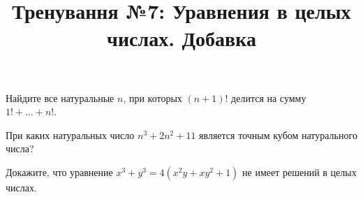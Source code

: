 



\title{Тренування №7: Уравнения в целых числах. Добавка}
\maketitle

\begin{problem}[Факториалы]
	Найдите все натуральные $n$, при которых $(n + 1)!$ делится на сумму $1! + \ldots + n!$.
\end{problem}

\begin{problem}
	При каких натуральных число $n^3 + 2n^2 + 11$ является точным кубом натурального числа?
\end{problem}

\begin{problem}
	Докажите, что уравнение $x^3 + y^3 = 4(x^2 y + x y^2 + 1)$ не имеет решений в целых числах.
\end{problem}

